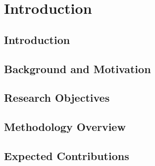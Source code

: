 \doublespacing %

\chapter{Introduction}
\label{ch1}

\begin{spacing}{1} %
\minitoc %
\end{spacing} %
\thesisspacing %

\section{Introduction}


\section{Background and Motivation}


\section{Research Objectives}


\section{Methodology Overview}


\section{Expected Contributions}

